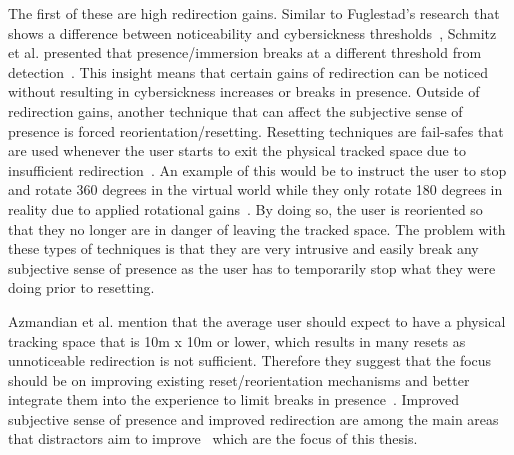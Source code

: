 The first of these are high redirection gains. Similar to Fuglestad's research that shows a difference between noticeability and cybersickness thresholds~\cite{fuglestad2018redirected}, Schmitz et al. presented that presence/immersion breaks at a different threshold from detection~\cite{schmitz2018you}. This insight means that certain gains of redirection can be noticed without resulting in cybersickness increases or breaks in presence.
Outside of redirection gains, another technique that can affect the subjective sense of presence is forced reorientation/resetting. Resetting techniques are fail-safes that are used whenever the user starts to exit the physical tracked space due to insufficient redirection~\cite{williams2007exploring}. An example of this would be to instruct the user to stop and rotate 360 degrees in the virtual world while they only rotate 180 degrees in reality due to applied rotational gains~\cite{suma2012taxonomy}. By doing so, the user is reoriented so that they no longer are in danger of leaving the tracked space. The problem with these types of techniques is that they are very intrusive and easily break any subjective sense of presence as the user has to temporarily stop what they were doing prior to resetting. 

Azmandian et al. mention that the average user should expect to have a physical tracking space that is 10m x 10m or lower, which results in many resets as unnoticeable redirection is not sufficient. Therefore they suggest that the focus should be on improving existing reset/reorientation mechanisms and better integrate them into the experience to limit breaks in presence~\cite{azmandian2015physical}. Improved subjective sense of presence and improved redirection are among the main areas that distractors aim to improve~\cite{peck2009evaluation, peck2011evaluation} which are the focus of this thesis.

